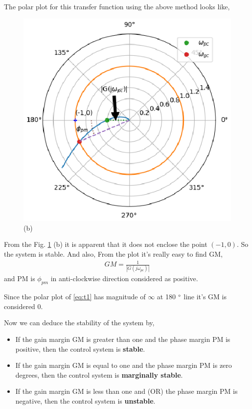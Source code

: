 \begin{enumerate}[label=\thesection.\arabic*.,ref=\thesection.\theenumi]
The polar plot for this transfer function using the above method looks like,
\begin{figure}[!h]
    \includegraphics[width=\columnwidth]{./figs/ee18btech11028/example.eps}
  \caption{(b)}
  \label{fig:example1}
\end{figure}


From the Fig. \ref{fig:example1} (b) it is apparent that it does not enclose the point $(-1,0)$.
So the system is stable.
And also,
From the plot it's really easy to find GM,
\begin{align}
    GM = \frac{1}{|G(j\omega_{pc})|}
\end{align}
and PM is $\phi_{pm}$ in anti-clockwise direction considered as positive.

Since the polar plot of \eqref{eq:t1} has magnitude of $\infty$ at 180 $\degree$ line it's GM is considered 0.

Now we can deduce the stability of the system by,
\begin{itemize}
    \item If the gain margin GM is greater than one and the phase margin PM is positive, then the control system is \textbf{stable}.
    \item If the gain margin GM is equal to one and the phase margin PM is zero degrees, then the control system is  \textbf{marginally stable}.
    \item If the gain margin GM is less than one and (OR) the phase margin PM is negative, then the control system is \textbf{unstable}.
\end{itemize}



\end{enumerate}
